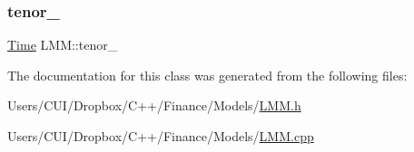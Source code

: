 \subsubsection{\texorpdfstring{tenor\+\_\+}{tenor\_}}
{\footnotesize\ttfamily \hyperlink{_name_def_8h_ac2d3e0ba793497bcca555c7c2cf64ff3}{Time} L\+M\+M\+::tenor\+\_\+\hspace{0.3cm}{\ttfamily [private]}}



The documentation for this class was generated from the following files\+:\begin{DoxyCompactItemize}
\item 
Users/\+C\+U\+I/\+Dropbox/\+C++/\+Finance/\+Models/\hyperlink{_l_m_m_8h}{L\+M\+M.\+h}\item 
Users/\+C\+U\+I/\+Dropbox/\+C++/\+Finance/\+Models/\hyperlink{_l_m_m_8cpp}{L\+M\+M.\+cpp}\end{DoxyCompactItemize}
